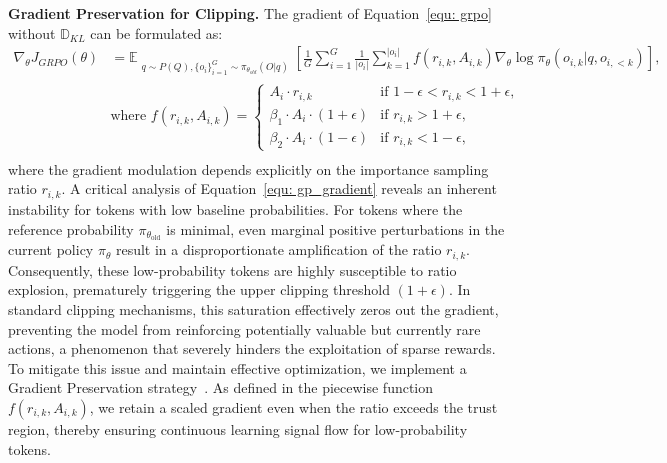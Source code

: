 \noindent\textbf{Gradient Preservation for Clipping.} The gradient of Equation~\eqref{equ: grpo} without $\mathbb{D}_{KL}$ can be formulated as:
\begin{equation}
\begin{aligned}
\nabla_\theta J_{GRPO}(\theta) & = \mathbb{E}_{\substack{q \sim P(Q),  \{o_i\}_{i=1}^G \sim \pi_{\theta_{old}}(O|q)}} \left[ \frac{1}{G} \sum_{i=1}^G \frac{1}{|o_i|} \sum_{k=1}^{|o_i|}f(r_{i,k}, {A}_{i,k})\nabla_\theta \log \pi_{\theta}(o_{i,k} | q, o_{i, <k}) \right],\\
&\text{where } f(r_{i,k}, {A}_{i,k}) = \begin{cases}
A_i \cdot r_{i,k} & \text{if } 1-\epsilon < r_{i,k} < 1+\epsilon, \\
\beta_1 \cdot A_i \cdot (1+\epsilon) & \text{if } r_{i,k} > 1+\epsilon, \\
\beta_2 \cdot A_i \cdot (1-\epsilon) & \text{if } r_{i,k} < 1-\epsilon,
\end{cases}\\
\label{equ: gp_gradient}
\end{aligned}
\end{equation}
where the gradient modulation depends explicitly on the importance sampling ratio $r_{i,k}$. 
A critical analysis of Equation~\eqref{equ: gp_gradient} reveals an inherent instability for tokens with low baseline probabilities. For tokens where the reference probability $\pi_{\theta_{\text{old}}}$ is minimal, even marginal positive perturbations in the current policy $\pi_{\theta}$ result in a disproportionate amplification of the ratio $r_{i,k}$. Consequently, these low-probability tokens are highly susceptible to ratio explosion, prematurely triggering the upper clipping threshold $(1+\epsilon)$. 
In standard clipping mechanisms, this saturation effectively zeros out the gradient, preventing the model from reinforcing potentially valuable but currently rare actions, a phenomenon that severely hinders the exploitation of sparse rewards. 
To mitigate this issue and maintain effective optimization, we implement a Gradient Preservation strategy~\cite{su2025gppo}.
As defined in the piecewise function $f(r_{i,k}, {A}_{i,k})$, we retain a scaled gradient even when the ratio exceeds the trust region, thereby ensuring continuous learning signal flow for low-probability tokens.
